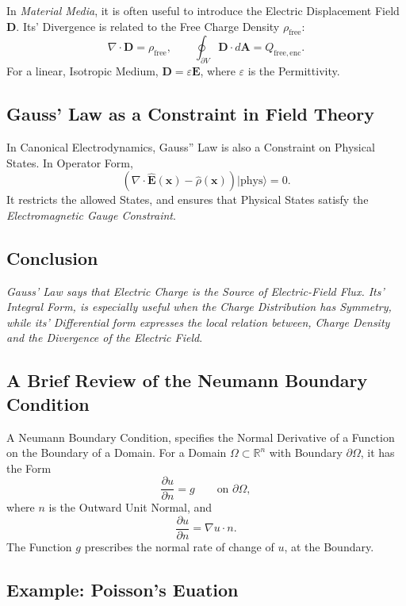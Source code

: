\documentclass[a4paper, 10pt, onepage]{elegantbook}
\begin{document}
In \emph{Material Media}, it is often useful to introduce the Electric Displacement Field \(\mathbf{D}\). Its' Divergence is related to the Free Charge Density \(\rho_{\mathrm{free}}\):
\[
\nabla\cdot\mathbf{D}=\rho_{\mathrm{free}},
\qquad
\oint_{\partial V}\mathbf{D}\cdot d\mathbf{A}
=Q_{\mathrm{free,enc}}.
\]
For a linear, Isotropic Medium, \(\mathbf{D}=\varepsilon\mathbf{E}\),
where \(\varepsilon\) is the Permittivity.

\subsection{Gauss' Law as a Constraint in Field Theory}

In Canonical Electrodynamics, Gauss'' Law is also a Constraint on
Physical States. In Operator Form,
\[
\left(\nabla\cdot\hat{\mathbf{E}}(\mathbf{x})
-\hat{\rho}(\mathbf{x})\right)|\mathrm{phys}\rangle=0.
\]
It restricts the allowed States, and ensures that Physical States satisfy the \emph{Electromagnetic Gauge Constraint}.

\subsection{Conclusion}

\emph{Gauss' Law says that Electric Charge is the Source of Electric-Field Flux. Its' Integral Form, is especially useful when the Charge Distribution has Symmetry, while its' Differential form expresses the local relation between, Charge Density and the Divergence of the Electric Field}.

\subsection{A Brief Review of the Neumann Boundary Condition}

A Neumann Boundary Condition, specifies the Normal Derivative of a Function on the Boundary of a Domain. For a Domain
\(\Omega\subset\mathbb{R}^n\) with Boundary \(\partial\Omega\), it has
the Form
\[
\frac{\partial u}{\partial n}=g
\qquad \text{on } \partial\Omega,
\]
where \(n\) is the Outward Unit Normal, and
\[
\frac{\partial u}{\partial n}
=\nabla u\cdot n.
\]
The Function \(g\) prescribes the normal rate of change of \(u\), at
the Boundary.

\subsection{Example: Poisson's Euation}
\end{document}
